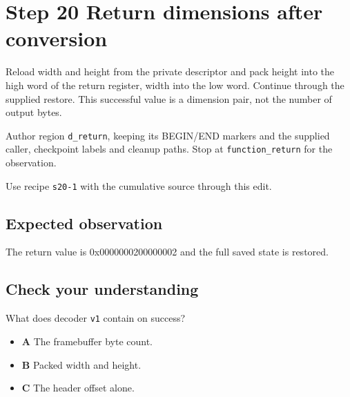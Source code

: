 \section{Step 20 Return dimensions after conversion}\label{ppm-s20}

Reload width and height from the private descriptor and pack height into the high word of the return register, width into the low word. Continue through the supplied restore. This successful value is a dimension pair, not the number of output bytes.

Author region \texttt{d\_return}, keeping its BEGIN/END markers and the supplied caller, checkpoint labels and cleanup paths. Stop at \texttt{function\_return} for the observation.

Use recipe \texttt{s20-1} with the cumulative source through this edit.

\subsection{Expected observation}
The return value is 0x0000000200000002 and the full saved state is restored.

\subsection{Check your understanding}
What does decoder \texttt{v1} contain on success?

\begin{itemize}
\item \textbf{A} The framebuffer byte count.
\item \textbf{B} Packed width and height.
\item \textbf{C} The header offset alone.
\end{itemize}
